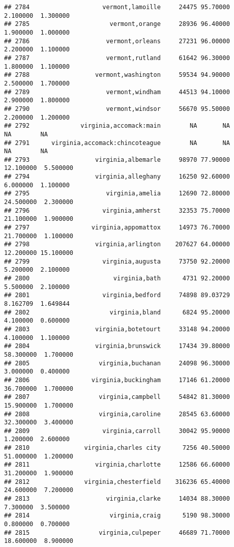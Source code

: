 \documentclass[
]{article}
\begin{document}
\begin{verbatim}
## 2784                    vermont,lamoille     24475 95.70000  2.100000  1.300000
## 2785                      vermont,orange     28936 96.40000  1.900000  1.000000
## 2786                     vermont,orleans     27231 96.00000  2.200000  1.100000
## 2787                     vermont,rutland     61642 96.30000  1.800000  1.100000
## 2788                  vermont,washington     59534 94.90000  2.500000  1.700000
## 2789                     vermont,windham     44513 94.10000  2.900000  1.800000
## 2790                     vermont,windsor     56670 95.50000  2.200000  1.200000
## 2792              virginia,accomack:main        NA       NA        NA        NA
## 2791      virginia,accomack:chincoteague        NA       NA        NA        NA
## 2793                  virginia,albemarle     98970 77.90000 12.100000  5.500000
## 2794                  virginia,alleghany     16250 92.60000  6.000000  1.100000
## 2795                     virginia,amelia     12690 72.80000 24.500000  2.300000
## 2796                    virginia,amherst     32353 75.70000 21.100000  1.900000
## 2797                 virginia,appomattox     14973 76.70000 21.700000  1.100000
## 2798                  virginia,arlington    207627 64.00000 12.200000 15.100000
## 2799                    virginia,augusta     73750 92.20000  5.200000  2.100000
## 2800                       virginia,bath      4731 92.20000  5.500000  2.100000
## 2801                    virginia,bedford     74898 89.03729  8.162709  1.649844
## 2802                      virginia,bland      6824 95.20000  4.100000  0.600000
## 2803                  virginia,botetourt     33148 94.20000  4.100000  1.100000
## 2804                  virginia,brunswick     17434 39.80000 58.300000  1.700000
## 2805                   virginia,buchanan     24098 96.30000  3.000000  0.400000
## 2806                 virginia,buckingham     17146 61.20000 36.700000  1.700000
## 2807                   virginia,campbell     54842 81.30000 15.900000  1.700000
## 2808                   virginia,caroline     28545 63.60000 32.300000  3.400000
## 2809                    virginia,carroll     30042 95.90000  1.200000  2.600000
## 2810               virginia,charles city      7256 40.50000 51.000000  1.200000
## 2811                  virginia,charlotte     12586 66.60000 31.200000  1.900000
## 2812               virginia,chesterfield    316236 65.40000 24.600000  7.200000
## 2813                     virginia,clarke     14034 88.30000  7.300000  3.500000
## 2814                      virginia,craig      5190 98.30000  0.800000  0.700000
## 2815                   virginia,culpeper     46689 71.70000 18.600000  8.900000

\end{verbatim}
\end{document}
